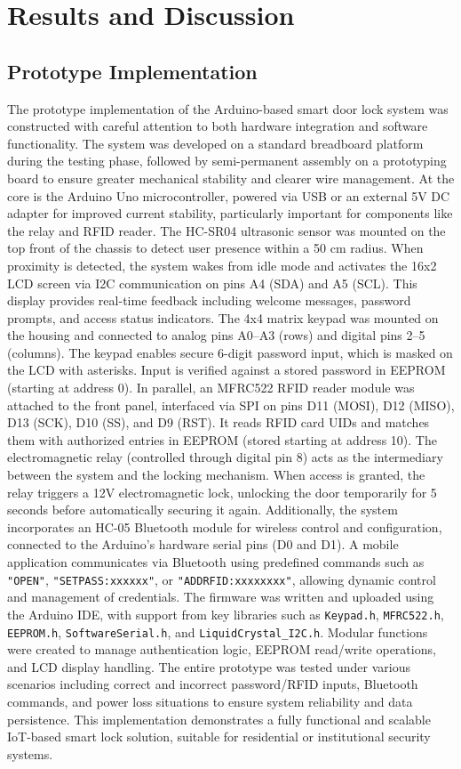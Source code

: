 \documentclass[conference, onecolumn]{IEEEtran}
\begin{document}
\section{Results and Discussion}
\subsection{Prototype Implementation}
The prototype implementation of the Arduino-based smart door lock system was constructed with careful attention to both hardware integration and software functionality. The system was developed on a standard breadboard platform during the testing phase, followed by semi-permanent assembly on a prototyping board to ensure greater mechanical stability and clearer wire management.
At the core is the Arduino Uno microcontroller, powered via USB or an external 5V DC adapter for improved current stability, particularly important for components like the relay and RFID reader. The HC-SR04 ultrasonic sensor was mounted on the top front of the chassis to detect user presence within a 50 cm radius. When proximity is detected, the system wakes from idle mode and activates the 16x2 LCD screen via I2C communication on pins A4 (SDA) and A5 (SCL). This display provides real-time feedback including welcome messages, password prompts, and access status indicators.
The 4x4 matrix keypad was mounted on the housing and connected to analog pins A0–A3 (rows) and digital pins 2–5 (columns). The keypad enables secure 6-digit password input, which is masked on the LCD with asterisks. Input is verified against a stored password in EEPROM (starting at address 0). In parallel, an MFRC522 RFID reader module was attached to the front panel, interfaced via SPI on pins D11 (MOSI), D12 (MISO), D13 (SCK), D10 (SS), and D9 (RST). It reads RFID card UIDs and matches them with authorized entries in EEPROM (stored starting at address 10).
The electromagnetic relay (controlled through digital pin 8) acts as the intermediary between the system and the locking mechanism. When access is granted, the relay triggers a 12V electromagnetic lock, unlocking the door temporarily for 5 seconds before automatically securing it again.
Additionally, the system incorporates an HC-05 Bluetooth module for wireless control and configuration, connected to the Arduino's hardware serial pins (D0 and D1). A mobile application communicates via Bluetooth using predefined commands such as \texttt{"OPEN"}, \texttt{"SETPASS:xxxxxx"}, or \texttt{"ADDRFID:xxxxxxxx"}, allowing dynamic control and management of credentials.
The firmware was written and uploaded using the Arduino IDE, with support from key libraries such as \texttt{Keypad.h}, \texttt{MFRC522.h}, \texttt{EEPROM.h}, \texttt{SoftwareSerial.h}, and \texttt{LiquidCrystal\_I2C.h}. Modular functions were created to manage authentication logic, EEPROM read/write operations, and LCD display handling.
The entire prototype was tested under various scenarios including correct and incorrect password/RFID inputs, Bluetooth commands, and power loss situations to ensure system reliability and data persistence. This implementation demonstrates a fully functional and scalable IoT-based smart lock solution, suitable for residential or institutional security systems.
\end{document}
